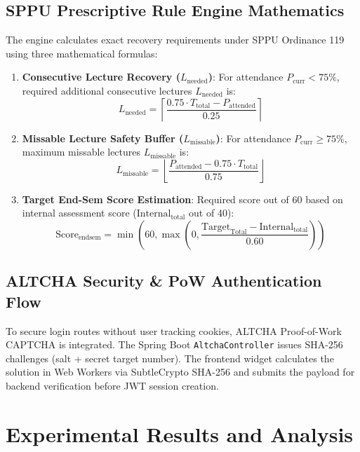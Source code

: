 \documentclass[conference]{IEEEtran}
\begin{document}
\subsection{SPPU Prescriptive Rule Engine Mathematics}
The engine calculates exact recovery requirements under SPPU Ordinance 119 using three mathematical formulas:
\begin{enumerate}
    \item \textbf{Consecutive Lecture Recovery ($L_{\text{needed}}$)}: For attendance $P_{\text{curr}} < 75\%$, required additional consecutive lectures $L_{\text{needed}}$ is:
    \begin{equation}
    L_{\text{needed}} = \left\lceil \frac{0.75 \cdot T_{\text{total}} - P_{\text{attended}}}{0.25} \right\rceil
    \end{equation}
    \item \textbf{Missable Lecture Safety Buffer ($L_{\text{missable}}$)}: For attendance $P_{\text{curr}} \ge 75\%$, maximum missable lectures $L_{\text{missable}}$ is:
    \begin{equation}
    L_{\text{missable}} = \left\lfloor \frac{P_{\text{attended}} - 0.75 \cdot T_{\text{total}}}{0.75} \right\rfloor
    \end{equation}
    \item \textbf{Target End-Sem Score Estimation}: Required score out of 60 based on internal assessment score ($\text{Internal}_{\text{total}}$ out of 40):
    \begin{equation}
    \text{Score}_{\text{endsem}} = \min\left(60, \max\left(0, \frac{\text{Target}_{\text{Total}} - \text{Internal}_{\text{total}}}{0.60}\right)\right)
    \end{equation}
\end{enumerate}

\subsection{ALTCHA Security \& PoW Authentication Flow}
To secure login routes without user tracking cookies, ALTCHA Proof-of-Work CAPTCHA is integrated. The Spring Boot \texttt{AltchaController} issues SHA-256 challenges (salt + secret target number). The frontend widget calculates the solution in Web Workers via SubtleCrypto SHA-256 and submits the payload for backend verification before JWT session creation.

\section{Experimental Results and Analysis}
\end{document}
